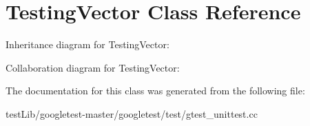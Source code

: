 \hypertarget{classTestingVector}{}\section{Testing\+Vector Class Reference}
\label{classTestingVector}


Inheritance diagram for Testing\+Vector\+:


Collaboration diagram for Testing\+Vector\+:


The documentation for this class was generated from the following file\+:\begin{DoxyCompactItemize}
\item 
test\+Lib/googletest-\/master/googletest/test/gtest\+\_\+unittest.\+cc\end{DoxyCompactItemize}
